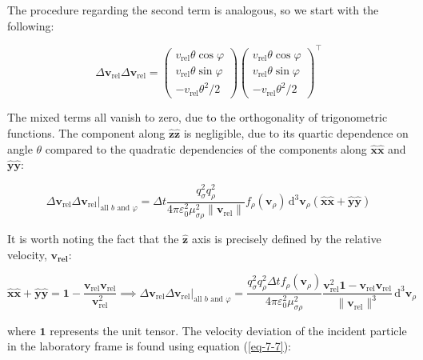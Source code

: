 The procedure regarding the second term is analogous, so we start with the following:

\begin{equation}
    \Delta\mathbf{v}_\text{rel}\Delta\mathbf{v}_\text{rel}=\begin{pmatrix}v_\text{rel}\theta\cos{\varphi}\\v_\text{rel}\theta\sin{\varphi}\\-v_\text{rel}\theta^2/2\end{pmatrix}\begin{pmatrix}v_\text{rel}\theta\cos{\varphi}\\v_\text{rel}\theta\sin{\varphi}\\-v_\text{rel}\theta^2/2\end{pmatrix}^\top
\end{equation}

The mixed terms all vanish to zero, due to the orthogonality of trigonometric functions. The component along $\mathbf{\hat{z}}\mathbf{\hat{z}}$ is negligible, due to its quartic dependence on angle $\theta$ compared to the quadratic dependencies of the components along $\mathbf{\hat{x}}\mathbf{\hat{x}}$ and $\mathbf{\hat{y}}\mathbf{\hat{y}}$:

\begin{equation}
    \Delta\mathbf{v}_\text{rel}\Delta\mathbf{v}_\text{rel}\Bigr|_{\text{all }b\text{ and }\varphi}=\Delta t\frac{q_\sigma ^2q_\rho ^2}{4\pi\varepsilon_0^2\mu_{\sigma\rho}^2\|\mathbf{v}_\text{rel}\|}f_\rho (\mathbf{v}_\rho )\,\mathrm{d}^3\mathbf{v}_\rho \left(\mathbf{\hat{x}}\mathbf{\hat{x}}+\mathbf{\hat{y}}\mathbf{\hat{y}}\right)
\end{equation}

It is worth noting the fact that the $\mathbf{\hat{z}}$ axis is precisely defined by the relative velocity, $\mathbf{v_\text{rel}}$:

\begin{equation}
    \mathbf{\hat{x}}\mathbf{\hat{x}}+\mathbf{\hat{y}}\mathbf{\hat{y}}=\mathbf{1}-\frac{\mathbf{v}_\text{rel}\mathbf{v}_\text{rel}}{\mathbf{v}_\text{rel}^2}\implies\Delta\mathbf{v}_\text{rel}\Delta\mathbf{v}_\text{rel}\Bigr|_{\text{all }b\text{ and }\varphi}=\frac{q_\sigma ^2q_\rho ^2\Delta t f_\rho (\mathbf{v}_\rho )}{4\pi\varepsilon_0^2\mu_{\sigma\rho}^2}\frac{\mathbf{v}_\text{rel}^2\mathbf{1}-\mathbf{v}_\text{rel}\mathbf{v}_\text{rel}}{\|\mathbf{v}_\text{rel}\|^3}\,\mathrm{d}^3\mathbf{v}_\rho 
\end{equation}

where $\mathbf{1}$ represents the unit tensor. The velocity deviation of the incident particle in the laboratory frame is found using equation (\ref{eq-7-7}):

